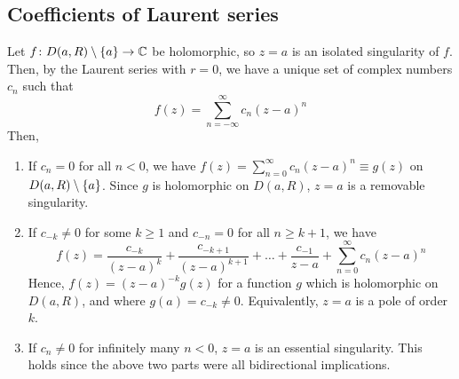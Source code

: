 \subsection{Coefficients of Laurent series}
Let \( f \colon D(a,R) \setminus \qty{a} \to \mathbb C \) be holomorphic, so \( z = a \) is an isolated singularity of \( f \).
Then, by the Laurent series with \( r = 0 \), we have a unique set of complex numbers \( c_n \) such that
\[
	f(z) = \sum_{n=-\infty}^\infty c_n (z-a)^n
\]
Then,
\begin{enumerate}
	\item If \( c_n = 0 \) for all \( n < 0 \), we have \( f(z) = \sum_{n=0}^\infty c_n (z-a)^n \equiv g(z) \) on \( D(a,R) \setminus \qty{a} \).
	      Since \( g \) is holomorphic on \( D(a,R) \), \( z = a \) is a removable singularity.
	\item If \( c_{-k} \neq 0 \) for some \( k \geq 1 \) and \( c_{-n} = 0 \) for all \( n \geq k + 1 \), we have
	      \[
		      f(z) = \frac{c_{-k}}{(z-a)^k} + \frac{c_{-k+1}}{(z-a)^{k+1}} + \dots + \frac{c_{-1}}{z-a} + \sum_{n=0}^\infty c_n (z-a)^n
	      \]
	      Hence, \( f(z) = (z-a)^{-k} g(z) \) for a function \( g \) which is holomorphic on \( D(a,R) \), and where \( g(a) = c_{-k} \neq 0 \).
	      Equivalently, \( z = a \) is a pole of order \( k \).
	\item If \( c_n \neq 0 \) for infinitely many \( n < 0 \), \( z = a \) is an essential singularity.
	      This holds since the above two parts were all bidirectional implications.
\end{enumerate}


